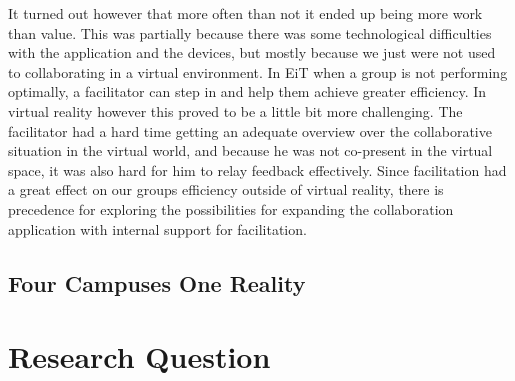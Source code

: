         It turned out however that more often than not it ended up being more work than value. This was partially because there was some technological difficulties with the application and the devices, but mostly because we just were not used to collaborating in a virtual environment. In EiT when a group is not performing optimally, a facilitator can step in and help them achieve greater efficiency. In virtual reality however this proved to be a little bit more challenging. The facilitator had a hard time getting an adequate overview over the collaborative situation in the virtual world, and because he was not co-present in the virtual space, it was also hard for him to relay feedback effectively. Since facilitation had a great effect on our groups efficiency outside of virtual reality, there is precedence for exploring the possibilities for expanding the collaboration application with internal support for facilitation.
            
        \subsection{Four Campuses One Reality}
    
        
    \section{Research Question}
    

    
